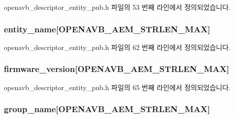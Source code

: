 openavb\+\_\+descriptor\+\_\+entity\+\_\+pub.\+h 파일의 53 번째 라인에서 정의되었습니다.

\subsubsection[{\texorpdfstring{entity\+\_\+name}{entity_name}}]{ entity\+\_\+name\mbox{[}{\bf O\+P\+E\+N\+A\+V\+B\+\_\+\+A\+E\+M\+\_\+\+S\+T\+R\+L\+E\+N\+\_\+\+M\+AX}\mbox{]}}\hypertarget{structopenavb__aem__descriptor__entity__t_acca6809b076e4fb96d754bc0dd1a8568}{}\label{structopenavb__aem__descriptor__entity__t_acca6809b076e4fb96d754bc0dd1a8568}


openavb\+\_\+descriptor\+\_\+entity\+\_\+pub.\+h 파일의 62 번째 라인에서 정의되었습니다.

\subsubsection[{\texorpdfstring{firmware\+\_\+version}{firmware_version}}]{ firmware\+\_\+version\mbox{[}{\bf O\+P\+E\+N\+A\+V\+B\+\_\+\+A\+E\+M\+\_\+\+S\+T\+R\+L\+E\+N\+\_\+\+M\+AX}\mbox{]}}\hypertarget{structopenavb__aem__descriptor__entity__t_ae85645277573a0803121e24b322f288e}{}\label{structopenavb__aem__descriptor__entity__t_ae85645277573a0803121e24b322f288e}


openavb\+\_\+descriptor\+\_\+entity\+\_\+pub.\+h 파일의 65 번째 라인에서 정의되었습니다.

\subsubsection[{\texorpdfstring{group\+\_\+name}{group_name}}]{ group\+\_\+name\mbox{[}{\bf O\+P\+E\+N\+A\+V\+B\+\_\+\+A\+E\+M\+\_\+\+S\+T\+R\+L\+E\+N\+\_\+\+M\+AX}\mbox{]}}\hypertarget{structopenavb__aem__descriptor__entity__t_a1b4ca6cc3841877c58f1665c9180ebb0}{}\label{structopenavb__aem__descriptor__entity__t_a1b4ca6cc3841877c58f1665c9180ebb0}


